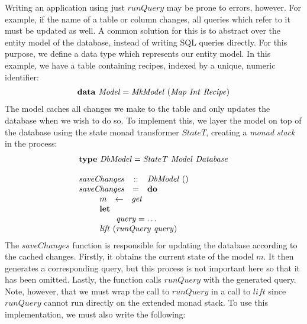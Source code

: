 Writing an application using just $\mathit{runQuery}$ may be prone to errors, however. For example, if the name of a table or column changes, all queries which refer to it must be updated as well. A common solution for this is to abstract over the entity model of the database, instead of writing SQL queries directly. For this purpose, we define a data type which represents our entity model. In this example, we have a table containing recipes, indexed by a unique, numeric identifier:
\begin{displaymath}
\begin{array}{lcl}
\multicolumn{3}{l}{\mathbf{data}~\mathit{Model} = \mathit{MkModel}~(\mathit{Map}~\mathit{Int}~\mathit{Recipe})}
\end{array}
\end{displaymath}
The model caches all changes we make to the table and only updates the database when we wish to do so. To implement this, we layer the model on top of the database using the state monad transformer $\mathit{StateT}$, creating a \emph{monad stack} in the process:
\begin{displaymath}
\begin{array}{lcl}
\multicolumn{3}{l}{\mathbf{type}~\mathit{DbModel} = \mathit{StateT}~\mathit{Model}~\mathit{Database}}\\\\
\mathit{saveChanges} & :: & \mathit{DbModel}~() \\
\mathit{saveChanges} & = & \mathbf{do} \\
\multicolumn{3}{l}{\qquad \begin{array}{lcl}
    m & \leftarrow & \mathit{get} \\
    \multicolumn{3}{l}{\mathbf{let}} \\
    \multicolumn{3}{l}{\qquad \mathit{query} = \ldots} \\
    \multicolumn{3}{l}{\mathit{lift}~(\mathit{runQuery}~\mathit{query})}
\end{array} }
\end{array}
\end{displaymath}
The $\mathit{saveChanges}$ function is responsible for updating the database according to the cached changes. Firstly, it obtains the current state of the model $m$. It then generates a corresponding query, but this process is not important here so that it has been omitted. Lastly, the function calls $\mathit{runQuery}$ with the generated query. Note, however, that we must wrap the call to $\mathit{runQuery}$ in a call to $\mathit{lift}$ since $\mathit{runQuery}$ cannot run directly on the extended monad stack. To use this implementation, we must also write the following:
